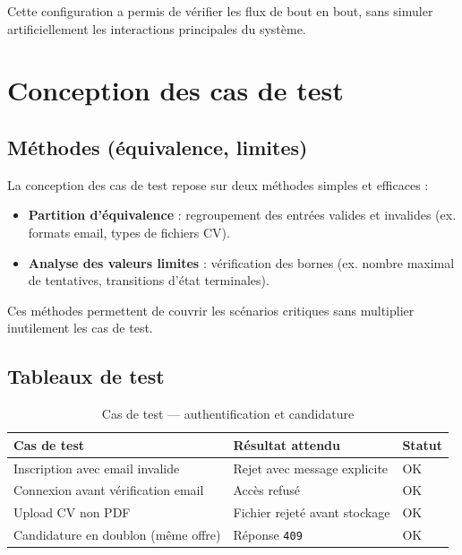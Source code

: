Cette configuration a permis de vérifier les flux de bout en bout, sans
simuler artificiellement les interactions principales du système.

\section{Conception des cas de test}

\subsection{Méthodes (équivalence, limites)}

La conception des cas de test repose sur deux méthodes simples et efficaces :
\begin{itemize}
    \item \textbf{Partition d'équivalence} : regroupement des entrées
    valides et invalides (ex. formats email, types de fichiers CV).
    \item \textbf{Analyse des valeurs limites} : vérification des bornes
    (ex. nombre maximal de tentatives, transitions d'état terminales).
\end{itemize}

Ces méthodes permettent de couvrir les scénarios critiques sans multiplier
inutilement les cas de test.

\subsection{Tableaux de test}

\begin{table}[H]
\centering
\caption{Cas de test --- authentification et candidature}
\begin{tabularx}{\textwidth}{|X|X|l|}
\hline
\textbf{Cas de test} & \textbf{Résultat attendu} & \textbf{Statut} \\
\hline
Inscription avec email invalide & Rejet avec message explicite &
\textcolor{green!60!black}{OK} \\
\hline
Connexion avant vérification email & Accès refusé &
\textcolor{green!60!black}{OK} \\
\hline
Upload CV non PDF & Fichier rejeté avant stockage &
\textcolor{green!60!black}{OK} \\
\hline
Candidature en doublon (même offre) & Réponse \texttt{409} &
\textcolor{green!60!black}{OK} \\
\hline
\end{tabularx}
\end{table}

